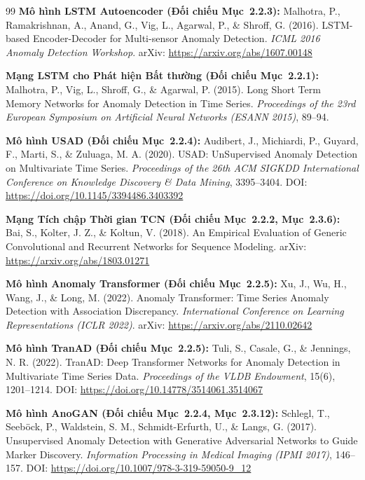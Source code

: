\begin{thebibliography}{99}
     \textbf{Mô hình LSTM Autoencoder (Đối chiếu Mục~2.2.3):} Malhotra, P., Ramakrishnan, A., Anand, G., Vig, L., Agarwal, P., \& Shroff, G. (2016). LSTM-based Encoder-Decoder for Multi-sensor Anomaly Detection. \textit{ICML 2016 Anomaly Detection Workshop}. arXiv: \url{https://arxiv.org/abs/1607.00148}
    
     \textbf{Mạng LSTM cho Phát hiện Bất thường (Đối chiếu Mục~2.2.1):} Malhotra, P., Vig, L., Shroff, G., \& Agarwal, P. (2015). Long Short Term Memory Networks for Anomaly Detection in Time Series. \textit{Proceedings of the 23rd European Symposium on Artificial Neural Networks (ESANN 2015)}, 89--94.
    
     \textbf{Mô hình USAD (Đối chiếu Mục~2.2.4):} Audibert, J., Michiardi, P., Guyard, F., Marti, S., \& Zuluaga, M. A. (2020). USAD: UnSupervised Anomaly Detection on Multivariate Time Series. \textit{Proceedings of the 26th ACM SIGKDD International Conference on Knowledge Discovery \& Data Mining}, 3395--3404. DOI: \url{https://doi.org/10.1145/3394486.3403392}
    
     \textbf{Mạng Tích chập Thời gian TCN (Đối chiếu Mục~2.2.2, Mục~2.3.6):} Bai, S., Kolter, J. Z., \& Koltun, V. (2018). An Empirical Evaluation of Generic Convolutional and Recurrent Networks for Sequence Modeling. arXiv: \url{https://arxiv.org/abs/1803.01271}
    
     \textbf{Mô hình Anomaly Transformer (Đối chiếu Mục~2.2.5):} Xu, J., Wu, H., Wang, J., \& Long, M. (2022). Anomaly Transformer: Time Series Anomaly Detection with Association Discrepancy. \textit{International Conference on Learning Representations (ICLR 2022)}. arXiv: \url{https://arxiv.org/abs/2110.02642}
    
     \textbf{Mô hình TranAD (Đối chiếu Mục~2.2.5):} Tuli, S., Casale, G., \& Jennings, N. R. (2022). TranAD: Deep Transformer Networks for Anomaly Detection in Multivariate Time Series Data. \textit{Proceedings of the VLDB Endowment}, 15(6), 1201--1214. DOI: \url{https://doi.org/10.14778/3514061.3514067}
    
     \textbf{Mô hình AnoGAN (Đối chiếu Mục~2.2.4, Mục~2.3.12):} Schlegl, T., Seeb{\"o}ck, P., Waldstein, S. M., Schmidt-Erfurth, U., \& Langs, G. (2017). Unsupervised Anomaly Detection with Generative Adversarial Networks to Guide Marker Discovery. \textit{Information Processing in Medical Imaging (IPMI 2017)}, 146--157. DOI: \url{https://doi.org/10.1007/978-3-319-59050-9_12}
    

\end{thebibliography}
